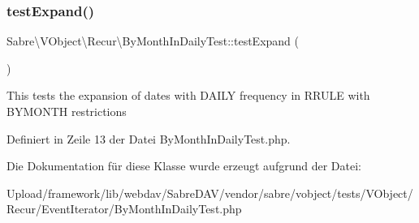 \subsubsection{\texorpdfstring{test\+Expand()}{testExpand()}}
{\footnotesize\ttfamily Sabre\textbackslash{}\+V\+Object\textbackslash{}\+Recur\textbackslash{}\+By\+Month\+In\+Daily\+Test\+::test\+Expand (\begin{DoxyParamCaption}{ }\end{DoxyParamCaption})}

This tests the expansion of dates with D\+A\+I\+LY frequency in R\+R\+U\+LE with B\+Y\+M\+O\+N\+TH restrictions 

Definiert in Zeile 13 der Datei By\+Month\+In\+Daily\+Test.\+php.



Die Dokumentation für diese Klasse wurde erzeugt aufgrund der Datei\+:\begin{DoxyCompactItemize}
\item 
Upload/framework/lib/webdav/\+Sabre\+D\+A\+V/vendor/sabre/vobject/tests/\+V\+Object/\+Recur/\+Event\+Iterator/By\+Month\+In\+Daily\+Test.\+php\end{DoxyCompactItemize}
